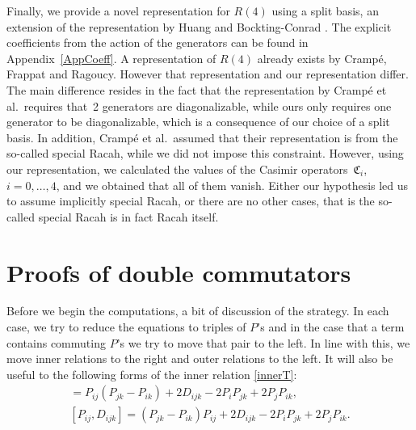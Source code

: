 \documentclass[10pt,a4paper]{amsart}
\numberwithin{equation}{section}
\begin{document}
Finally, we provide a novel representation for $R(4)$ using a split basis, an extension of the representation by Huang and Bockting-Conrad \cite{HBC2020}. The explicit coefficients from the action of the generators can be found in Appendix~\ref{AppCoeff}. A representation of $R(4)$ already exists \cite{Crampe2023} by Cramp\'{e}, Frappat and Ragoucy. However that representation and our representation differ. The main difference resides in the fact that the representation by Cramp\'{e} et al.\ requires that~2 generators are diagonalizable, while ours only requires one generator to be diagonalizable, which is a consequence of our choice of a split basis. In addition, Cramp\'e et al.\ assumed that their representation is from the so-called special Racah, while we did not impose this constraint. However, using our representation, we calculated the values of the Casimir operators~$\mathfrak{C}_i$,~${i=0,\dots,4}$, and we obtained that all of them vanish. Either our hypothesis led us to assume implicitly special Racah, or there are no other cases, that is the so-called special Racah is in fact Racah itself.

\appendix


\section{Proofs of double commutators}\label{AppendixA}
Before we begin the computations, a bit of discussion of the strategy. In each case, we try to reduce the equations to triples of $P$'s and in the case that a term contains commuting $P$'s we try to move that pair to the left. In line with this, we move inner relations to the right and outer relations to the left. It will also be useful to the following forms of the inner relation \eqref{innerT}:
\begin{gather*}
 [P_{ij}, D_{ ijk}] = P_{ij} (P_{jk}- P_{ik}) +2D_{ijk} - 2P_i P_{jk} +2P_jP_{ik},\\
[P_{ij}, D_{ ijk}] = (P_{jk}- P_{ik}) P_{ij} +2D_{ijk} - 2P_i P_{jk} +2P_jP_{ik}.\end{gather*}
\end{document}
